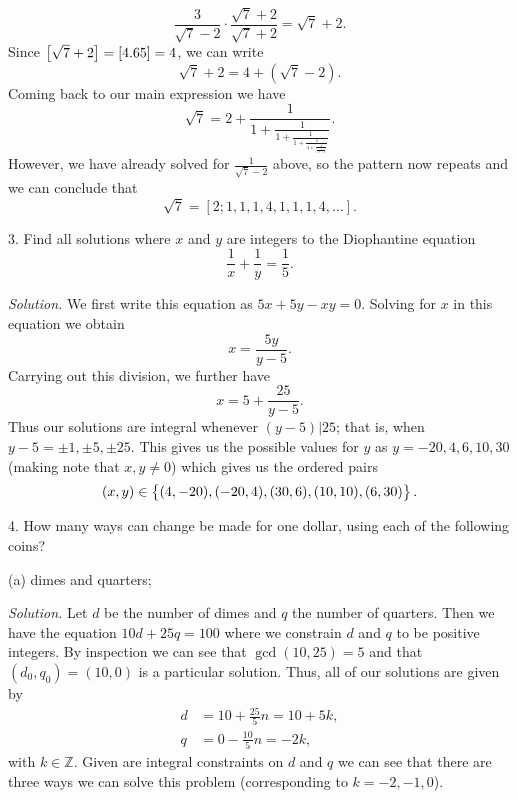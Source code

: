 \documentclass{article}
\newcommand{\Z}{\mathbb{Z}}
\begin{document}
%
\begin{equation*}
    \frac{3}{\sqrt{7} - 2} \cdot \frac{\sqrt{7} + 2}{\sqrt{7} + 2} = \sqrt{7} + 2
    .
\end{equation*}
%
Since $\sbr[1]{\sqrt{7} + 2} = [4.65] = 4$, we can write
%
\begin{equation*}
    \sqrt{7} + 2 = 4 + (\sqrt{7} - 2)
    .
\end{equation*}
%
Coming back to our main expression we have
%
\begin{equation*}
    \sqrt{7} = 2 + \frac{1}{1 + \frac{1}{1 + \frac{1}{1 + \frac{1}{4 + \frac{1}{\frac{1}{\sqrt{7} - 2}}}}}}
    .
\end{equation*}
%
However, we have already solved for $\frac{1}{\sqrt{7} - 2}$ above, so
the pattern now repeats and we can conclude that
%
\begin{equation*}
    \sqrt{7} = [2; 1, 1, 1, 4, 1, 1, 1, 4, \ldots]
    .
\end{equation*}

\newpage

3. Find all solutions where $x$ and $y$ are integers to the Diophantine
   equation
%
\begin{equation*}
    \frac{1}{x} + \frac{1}{y} = \frac{1}{5}
    .
\end{equation*}

\textit{Solution.}
We first write this equation as $5x + 5y - xy = 0$. Solving for $x$ in
this equation we obtain
%
\begin{equation*}
    x = \frac{5 y}{y - 5}
    .
\end{equation*}
%
Carrying out this division, we further have
%
\begin{equation*}
    x = 5 + \frac{25}{y - 5}
    .
\end{equation*}
%
Thus our solutions are integral whenever $(y - 5)|25$; that is, when $y
- 5 = \pm 1, \pm 5, \pm 25$. This gives us the possible values for $y$
as $y = -20, 4, 6, 10, 30$ (making note that $x, y \neq 0$) which gives
us the ordered pairs
%
\begin{equation*}
    (x, y) \in \cbr{(4, -20), (-20, 4), (30, 6), (10, 10), (6, 30)}
    .
\end{equation*}

\newpage

4. How many ways can change be made for one dollar, using each of the following coins?

(a) dimes and quarters;

\textit{Solution.}
Let $d$ be the number of dimes and $q$ the number of quarters. Then we
have the equation $10 d + 25 q = 100$ where we constrain $d$ and $q$ to
be positive integers. By inspection we can see that $\gcd(10, 25) = 5$
and that $(d_0, q_0) = (10, 0)$ is a particular solution. Thus, all of
our solutions are given by
%
\begin{align*}
    d &= 10 + \frac{25}{5}n = 10 + 5k, \\
    q &= 0 - \frac{10}{5}n = -2 k
    ,
\end{align*}
%
with $k \in \Z$. Given are integral constraints on $d$ and $q$ we can
see that there are three ways we can solve this problem (corresponding
to $k = -2, -1, 0$).
\end{document}
